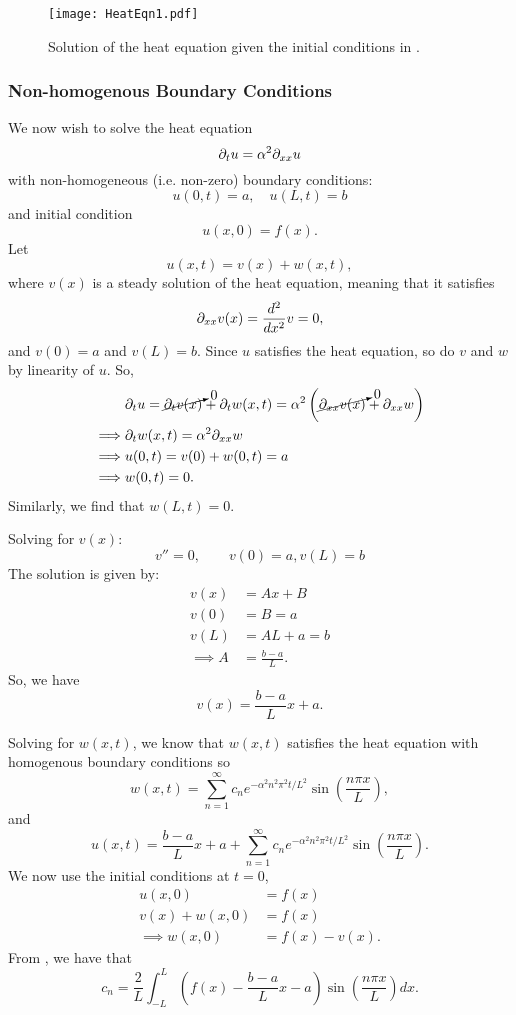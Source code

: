 \begin{figure}[!ht]
	\centering
	\texttt{[image: HeatEqn1.pdf]}
	\caption{Solution of the heat equation given the initial conditions in .}
	\label{fig:heateqneg1}
\end{figure}

\subsubsection{Non-homogenous Boundary Conditions}

We now wish to solve the heat equation 
\[
\partial_t u = \alpha^2 \partial_{xx} u
\]
with non-homogeneous (i.e. non-zero) boundary conditions:
\[
u(0,t) = a, \quad u(L,t) = b
\]
and initial condition
\[
u(x,0) = f(x).
\]
Let
\begin{equation}
	u(x,t) = v(x) + w(x,t),
\end{equation}
where $v(x)$ is a steady solution of the heat equation, meaning that it satisfies
\[
\partial_{xx} v(x) = \frac{d^2}{dx^2} v = 0,
\]
and $v(0) = a$ and $v(L) = b$.
Since $u$ satisfies the heat equation, so do $v$ and $w$ by linearity of $u$. So,
\begin{align*}
	& \partial_t u = \cancelto{0}{\partial_t v(x)} + \partial_t w(x,t) = \alpha^2 \left( \cancelto{0}{\partial_{xx} v(x)} + \partial_{xx} w \right)\\
	\implies & \partial_t w(x,t) = \alpha^2 \partial_{xx} w \\
	\implies & u(0,t) = v(0) + w(0,t) = a \\
	\implies & w(0,t) = 0.
\end{align*}
Similarly, we find that $w(L,t) = 0$.

Solving for $v(x)$:
\[
v'' = 0, \qquad v(0) = a, v(L) = b
\]
The solution is given by:
\begin{align*}
	v(x) &= Ax + B \\
	v(0) & = B = a \\
	v(L) & = AL + a = b \\
	\implies A &= \frac{b-a}{L}.
\end{align*}
So, we have
\[
v(x) = \frac{b-a}{L}x + a.
\]

Solving for $w(x,t)$, we know that $w(x,t)$ satisfies the heat equation with homogenous boundary conditions so 
\[
w(x,t) = \sum_{n=1}^{\infty} c_n e^{-\alpha^2 n^2 \pi^2 t/L^2} \sin\left(\frac{n\pi x}{L}\right),
\]
and
\begin{equation}
	u(x,t) = \frac{b-a}{L}x + a + \sum_{n=1}^{\infty} c_n e^{-\alpha^2 n^2 \pi^2 t/L^2} \sin\left(\frac{n\pi x}{L}\right).
\end{equation}
We now use the initial conditions at $t=0$, 
\begin{align*}
	u(x,0) &= f(x) \\
	v(x) + w(x,0) &= f(x) \\
	\implies w(x,0) &= f(x) - v(x).
\end{align*}
From , we have that 
\begin{equation}
	c_n = \frac{2}{L} \int_{-L}^L \left( f(x) - \frac{b-a}{L}x - a \right) \sin{\left(\frac{n \pi x}{L} \right)} dx.
\end{equation}

